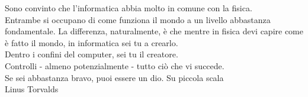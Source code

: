 \thispagestyle{empty}
\begin{flushright}

\vspace*{60mm}

Sono convinto che l'informatica abbia molto in comune con la fisica.\\
Entrambe si occupano di come funziona il mondo a un livello abbastanza fondamentale.
La differenza, naturalmente, è che mentre in fisica devi capire come è fatto il mondo,
in informatica sei tu a crearlo.\\

Dentro i confini del computer, sei tu il creatore.\\
Controlli - almeno potenzialmente - tutto ciò che vi succede.\\
Se sei abbastanza bravo, puoi essere un dio. Su piccola scala\\
\vspace{4mm}
Linus Torvalds\\




\end{flushright}